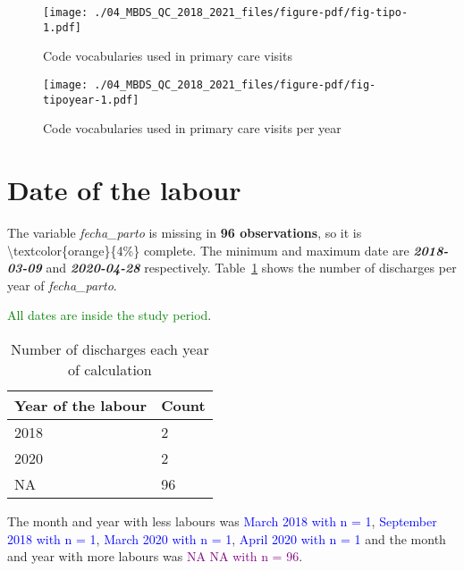 \documentclass[
  letterpaper,
  DIV=11,
  numbers=noendperiod]{scrreprt}
\begin{document}
\begin{figure}

{\centering \texttt{[image: ./04\_MBDS\_QC\_2018\_2021\_files/figure-pdf/fig-tipo-1.pdf]}

}

\caption{\label{fig-tipo}Code vocabularies used in primary care visits}

\end{figure}

\begin{figure}

{\centering \texttt{[image: ./04\_MBDS\_QC\_2018\_2021\_files/figure-pdf/fig-tipoyear-1.pdf]}

}

\caption{\label{fig-tipoyear}Code vocabularies used in primary care
visits per year}

\end{figure}

\hypertarget{date-of-the-labour-1}{%
\section{Date of the labour}\label{date-of-the-labour-1}}

The variable \emph{fecha\_parto} is missing in \textbf{96 observations},
so it is \textbackslash textcolor\{orange\}\{4\%\} complete. The minimum
and maximum date are \textbf{\emph{2018-03-09}} and
\textbf{\emph{2020-04-28}} respectively. Table~\ref{tbl-fechaparto}
shows the number of discharges per year of \emph{fecha\_parto}.

\textcolor{green}{All dates are inside the study period}.

\hypertarget{tbl-fechaparto}{}
\begin{longtable}{ll}
\caption{\label{tbl-fechaparto}Number of discharges each year of calculation }\tabularnewline

\toprule
Year of the labour & Count \\ 
\midrule
2018 & 2 \\ 
2020 & 2 \\ 
NA & 96 \\ 
\bottomrule
\end{longtable}

The month and year with less labours was
\textcolor{blue}{March 2018 with n = 1},
\textcolor{blue}{September 2018 with n = 1},
\textcolor{blue}{March 2020 with n = 1},
\textcolor{blue}{April 2020 with n = 1} and the month and year with more
labours was \textcolor{purple}{NA NA with n = 96}.
\end{document}
